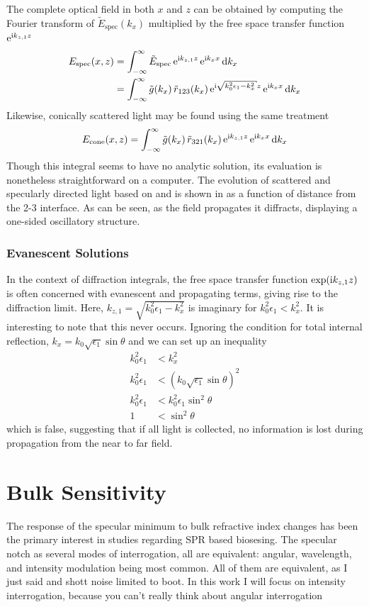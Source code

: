 \documentclass[a4paper,titlepage,onecolumn]{report}
\begin{document}
The complete optical field in both $x$ and $z$ can be obtained by computing
the Fourier transform of $\tilde{E}_\text{spec}(k_x)$ multiplied 
by the free space transfer function ${\mathrm{e}}^{{\mathrm{i}} k_{z,1} z}$
\begin{align}
E_\text{spec}(x,z) &= \intinfty \tilde{E}_\text{spec}\, \me^{\mi k_{z,1} z}\, \me^{\mi k_x x} \md k_x\\
 &= \intinfty \tilde{g}(k_x)\, \tilde{r}_{123}(k_x)\, \me^{\mi \sqrt{k_0^2 \epsilon_1 - k_x^2}z}\, \me^{\mi k_x x} \md k_x
\label{eqn:fourier123}
\end{align}
Likewise, conically scattered light may be found using the same treatment
\begin{align}
E_\text{cone}(x,z) = \int_{-\infty}^{\infty} \tilde{g}(k_x)\, \tilde{r}_{321}(k_x)\,{\mathrm{e}}^{{\mathrm{i}} k_{z,1} z}\, {\mathrm{e}}^{{\mathrm{i}} k_x x} \,\mathrm{d} k_x
\label{eqn:fourier321}
\end{align}
Though this integral seems to have no analytic solution, its evaluation is
nonetheless straightforward on a computer.
The evolution of scattered and specularly directed light based on
 and  is shown in
 as a function of distance from the 2-3
interface.  As can be seen, as the field propagates it diffracts,
displaying a one-sided oscillatory structure. 

\subsubsection{Evanescent Solutions}
In the context of diffraction integrals, the free space transfer function
$\exp({\mathrm{i}} k_{z,1} z)$ is often concerned with evanescent and propagating
terms, giving rise to the diffraction limit.  Here,
$k_{z,1}=\sqrt{k_0^2 \epsilon_1 - k_x^2}$ is imaginary for $k_0^2
\epsilon_1 < k_x^2$.  It is interesting to note that this never occurs.
Ignoring the condition for total internal reflection, 
$k_x = k_0 \sqrt{\epsilon_1} \sin \theta$ and we can set up an inequality
\begin{align}
k_0^2 \epsilon_1 &< k_x^2\\
k_0^2 \epsilon_1 &< \left(k_0 \sqrt{\epsilon_1} \sin \theta\right)^2\\
k_0^2 \epsilon_1 &< k_0^2 \epsilon_1 \sin^2 \theta\\
1 &< \sin^2 \theta
\end{align}
which is false, suggesting that if all light is collected, no information is
lost during propagation from the near to far field.
\section{Bulk Sensitivity}
The response of the specular minimum to bulk refractive index changes has been the primary interest in studies regarding SPR based biosesing.  The specular notch as several modes of interrogation, all are equivalent: angular, wavelength, and intensity modulation being most common.  All of them are equivalent, as I just said and shott noise limited to boot.  In this work I will focus on intensity interrogation, because you can't really think about angular interrogation
\end{document}
